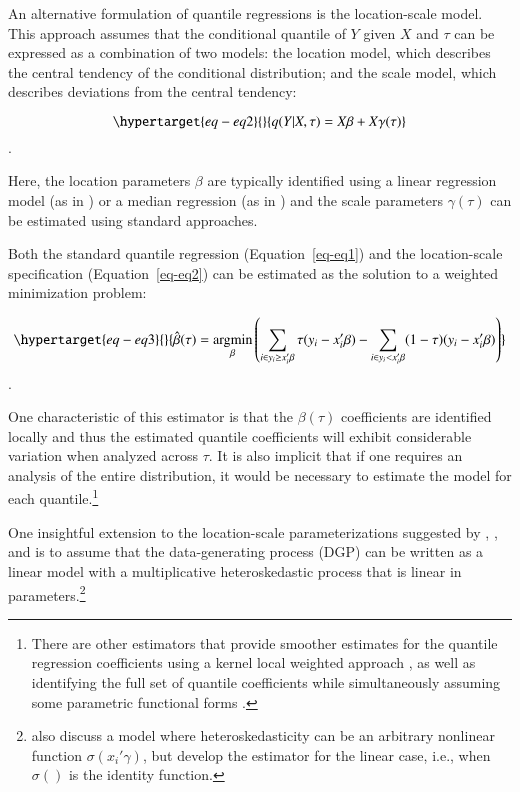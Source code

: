 \documentclass[
  authoryear,
  review,
  1p]{elsarticle}
\begin{document}
An alternative formulation of quantile regressions is the location-scale
model. This approach assumes that the conditional quantile of \(Y\)
given \(X\) and \(\tau\) can be expressed as a combination of two
models: the location model, which describes the central tendency of the
conditional distribution; and the scale model, which describes
deviations from the central tendency:

\begin{equation}\protect\hypertarget{eq-eq2}{}{q(Y|X,\tau) =X\beta+X\gamma(\tau)
}\label{eq-eq2}\end{equation}.

Here, the location parameters \(\beta\) are typically identified using a
linear regression model (as in \citet{mss2019}) or a median regression
(as in \citet{melly2005}) and the scale parameters \(\gamma(\tau)\) can
be estimated using standard approaches.

Both the standard quantile regression (Equation~\ref{eq-eq1}) and the
location-scale specification (Equation~\ref{eq-eq2}) can be estimated as
the solution to a weighted minimization problem:

\begin{equation}\protect\hypertarget{eq-eq3}{}{\hat{\beta}(\tau) = \underset{\beta}{\operatorname{argmin}}
\left( \sum_{i\in y_i\geq x_i'\beta} \tau (y_i - x_i'\beta) - \sum_{i\in y_i<x_i'\beta} (1-\tau)(y_i - x_i'\beta) \right)
}\label{eq-eq3}\end{equation}.

One characteristic of this estimator is that the \(\beta(\tau)\)
coefficients are identified locally and thus the estimated quantile
coefficients will exhibit considerable variation when analyzed across
\(\tau\). It is also implicit that if one requires an analysis of the
entire distribution, it would be necessary to estimate the model for
each quantile.\footnote{There are other estimators that provide smoother
  estimates for the quantile regression coefficients using a kernel
  local weighted approach \citep{kaplan2017}, as well as identifying the
  full set of quantile coefficients while simultaneously assuming some
  parametric functional forms \citep{frumentobotai2016}.}

One insightful extension to the location-scale parameterizations
suggested by \citet{he1997}, \citet{cameron2005}, and \citet{mss2019} is
to assume that the data-generating process (DGP) can be written as a
linear model with a multiplicative heteroskedastic process that is
linear in parameters.\footnote{\citet{mss2019} also discuss a model
  where heteroskedasticity can be an arbitrary nonlinear function
  \(\sigma(x_i'\gamma)\), but develop the estimator for the linear case,
  i.e., when \(\sigma()\) is the identity function.}
\end{document}
